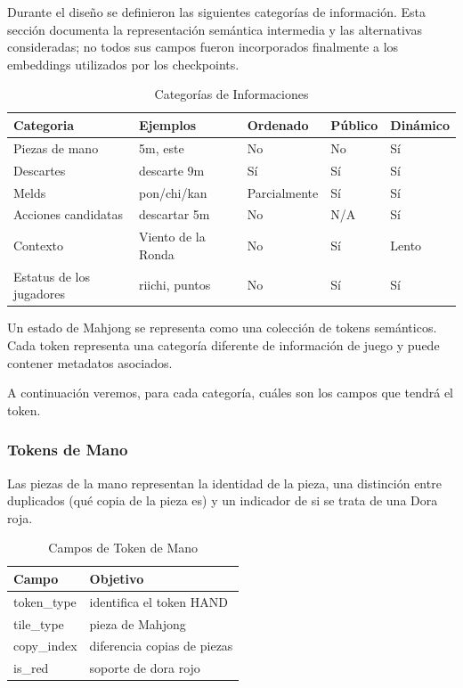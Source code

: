 Durante el diseño se definieron las siguientes categorías de información. Esta sección documenta la representación semántica intermedia y las alternativas consideradas; no todos sus campos fueron incorporados finalmente a los embeddings utilizados por los checkpoints.

\begin{table}[H]
  \centering
  \begin{tabular}{|l|l|l|l|l|}
    \hline
    \textbf{Categoria} & \textbf{Ejemplos} & \textbf{Ordenado} & \textbf{Público} & \textbf{Dinámico} \\
    \hline
    \hline
    Piezas de mano & 5m, este & No & No & Sí \\
    \hline
    Descartes & descarte 9m & Sí & Sí & Sí \\
    \hline
    Melds & pon/chi/kan & Parcialmente  & Sí & Sí \\
    \hline
    Acciones candidatas & descartar 5m & No & N/A & Sí
    \\
    \hline
    Contexto & Viento de la Ronda & No & Sí & Lento
    \\
    \hline
    Estatus de los jugadores & riichi, puntos & No & Sí & Sí \\
    \hline
  \end{tabular}
  \caption{Categorías de Informaciones}
  \label{tab:catinfo}
\end{table}

Un estado de Mahjong se representa como una colección de tokens semánticos. Cada token representa una categoría diferente de información de juego y puede contener metadatos asociados.

A continuación veremos, para cada categoría, cuáles son los campos que tendrá el token.

\subsubsection{Tokens de Mano}

Las piezas de la mano representan la identidad de la pieza, una distinción entre duplicados (qué copia de la pieza es) y un indicador de si se trata de una Dora roja.

\begin{table}[H]
  \centering
  \begin{tabular}{|l|l|}
  \hline
  \textbf{Campo} & \textbf{Objetivo}         \\ \hline
  token\_type    & identifica el token HAND    \\ \hline
  tile\_type     & pieza de Mahjong    \\ \hline
  copy\_index    & diferencia copias de piezas \\ \hline
  is\_red        & soporte de dora rojo        \\ \hline
  \end{tabular}
  \caption{Campos de Token de Mano}
  \label{tab:hand_token}
\end{table}

